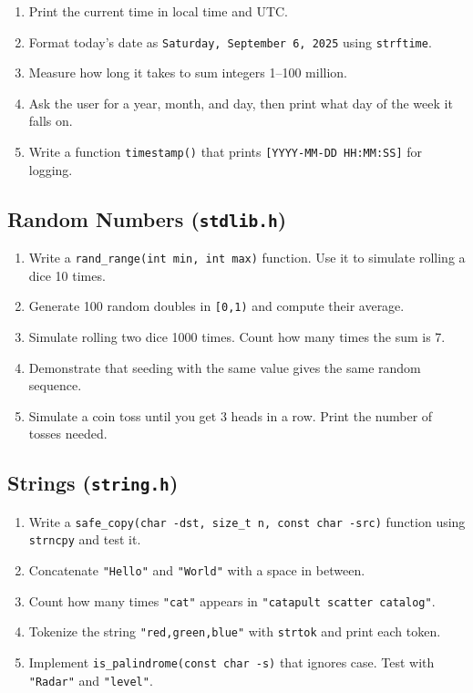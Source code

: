 \documentclass[
  letterpaper,
  DIV=11,
  numbers=noendperiod]{scrreprt}
\providecommand{\tightlist}{%
  \setlength{\itemsep}{0pt}\setlength{\parskip}{0pt}}
\begin{document}
\begin{enumerate}
\def\labelenumi{\arabic{enumi}.}
\setcounter{enumi}{10}
\tightlist
\item
  Print the current time in local time and UTC.
\item
  Format today's date as \texttt{Saturday,\ September\ 6,\ 2025} using
  \texttt{strftime}.
\item
  Measure how long it takes to sum integers 1--100 million.
\item
  Ask the user for a year, month, and day, then print what day of the
  week it falls on.
\item
  Write a function \texttt{timestamp()} that prints
  \texttt{{[}YYYY-MM-DD\ HH:MM:SS{]}} for logging.
\end{enumerate}

\subsection{\texorpdfstring{Random Numbers
(\texttt{stdlib.h})}{Random Numbers (stdlib.h)}}\label{random-numbers-stdlib.h-1}

\begin{enumerate}
\def\labelenumi{\arabic{enumi}.}
\setcounter{enumi}{15}
\tightlist
\item
  Write a \texttt{rand\_range(int\ min,\ int\ max)} function. Use it to
  simulate rolling a dice 10 times.
\item
  Generate 100 random doubles in \texttt{{[}0,1)} and compute their
  average.
\item
  Simulate rolling two dice 1000 times. Count how many times the sum is
  7.
\item
  Demonstrate that seeding with the same value gives the same random
  sequence.
\item
  Simulate a coin toss until you get 3 heads in a row. Print the number
  of tosses needed.
\end{enumerate}

\subsection{\texorpdfstring{Strings
(\texttt{string.h})}{Strings (string.h)}}\label{strings-string.h}

\begin{enumerate}
\def\labelenumi{\arabic{enumi}.}
\setcounter{enumi}{20}
\tightlist
\item
  Write a
  \texttt{safe\_copy(char\ -dst,\ size\_t\ n,\ const\ char\ -src)}
  function using \texttt{strncpy} and test it.
\item
  Concatenate \texttt{"Hello"} and \texttt{"World"} with a space in
  between.
\item
  Count how many times \texttt{"cat"} appears in
  \texttt{"catapult\ scatter\ catalog"}.
\item
  Tokenize the string \texttt{"red,green,blue"} with \texttt{strtok} and
  print each token.
\item
  Implement \texttt{is\_palindrome(const\ char\ -s)} that ignores case.
  Test with \texttt{"Radar"} and \texttt{"level"}.
\end{enumerate}
\end{document}
